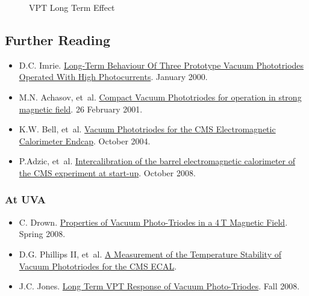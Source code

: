 \begin{figure}[htbp]
  \centering
  \caption{VPT Long Term Effect}
  \label{fig:eq_vpt:vpt_long_term}
\end{figure}

\subsection{Further Reading}
\label{sec:eq_vpt:reading}

\begin{itemize}
\item D.C. Imrie. \href{papers/VPT Burn-in}{Long-Term Behaviour Of Three Prototype Vacuum Phototriodes Operated With High Photocurrents}. January 2000.
\item M.N. Achasov, et~al. \href{papers/0102083v1-1}{Compact Vacuum Phototriodes for operation in strong magnetic field}.  26 February 2001.
\item K.W. Bell, et~al. \href{papers/1344324}{Vacuum Phototriodes for the CMS Electromagnetic Calorimeter Endcap}.  October 2004.
\item P.Adzic, et~al. \href{papers/jinst8_10_p10007}{Intercalibration of the barrel electromagnetic calorimeter of the CMS experiment at start-up}. October 2008.
\end{itemize}

\subsubsection{At UVA}
\begin{itemize}
\item C. Drown.  \href{papers/VPT_Phys393}{Properties of Vacuum Photo-Triodes in a 4\,T Magnetic Field}.  Spring 2008.
\item D.G. Phillips II, et~al. \href{papers/newvptpaper}{A Measurement of the Temperature Stability of Vacuum Phototriodes for the CMS ECAL}.
\item J.C. Jones. \href{papers/Long Term VPT Response of Vacuum Photo-Triodes}{Long Term VPT Response of Vacuum Photo-Triodes}. Fall 2008.
\end{itemize}


